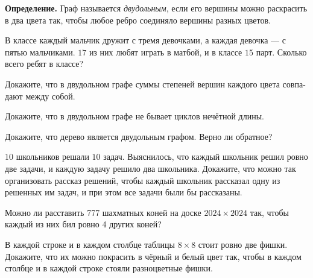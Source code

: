 \textbf{Определение.} Граф называется \textit{двудольным}, если его вершины можно раскрасить в два цвета так, чтобы любое ребро соединяло вершины разных цветов.

 В классе каждый мальчик дружит с тремя девочками, а каждая девочка $—$ с пятью мальчиками. $17$ из них любят играть в матбой, и в классе $15$ парт. Сколько всего ребят в классе?

Докажите, что в двудольном графе суммы степеней вершин каждого цвета совпа- дают между собой.

Докажите, что в двудольном графе не бывает циклов нечётной длины.

Докажите, что дерево является двудольным графом. Верно ли обратное?

$10$ школьников решали $10$ задач. Выяснилось, что каждый школьник решил ровно две задачи, и каждую задачу решило два школьника. Докажите, что можно так организовать рассказ решений, чтобы каждый школьник рассказал одну из решенных им задач, и при этом все задачи были бы рассказаны.

Можно ли расставить 777 шахматных коней на доске $2024\times 2024$ так, чтобы каждый из них бил ровно 4 других коней?

В каждой строке и в каждом столбце таблицы $8\times8$ стоит ровно две фишки. Докажите, что их можно покрасить в чёрный и белый цвет так, чтобы в каждом столбце и в каждой строке стояли разноцветные фишки.